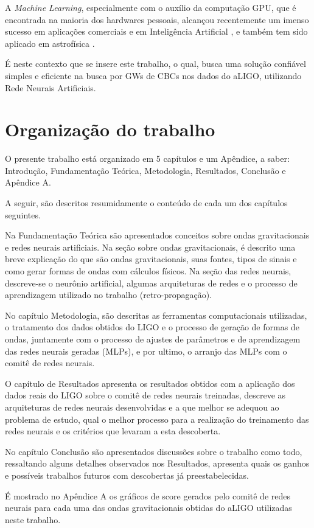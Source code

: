 A \textit{Machine Learning}, especialmente com o auxílio da computação GPU, que é encontrada na maioria dos hardwares pessoais, alcançou recentemente um imenso sucesso em aplicações comerciais e em Inteligência Artificial \cite{esteva2017dermatologist, moravvcik2017deepstack, van2016wavenet, 10.1007/978-3-319-44188-7_16}, e também tem sido aplicado em astrofísica \cite{shen2017denoising,PhysRevLett.120.141103,krastev2019real,gebhard2019convolutional,mukund2017transient,kim2015application,george2018deep,george2017glitch, george2017deepA}.

É neste contexto que se insere este trabalho, o qual, busca uma solução confiável simples e eficiente na busca por GWs de CBCs nos dados do aLIGO, utilizando Rede Neurais Artificiais.

\section{Organização do trabalho}
\label{sec:organizacao-do-trabalho}

O presente trabalho está organizado em 5 capítulos e um Apêndice, a saber: Introdução, Fundamentação Teórica, Metodologia, Resultados, Conclusão e Apêndice A. 

A seguir, são descritos resumidamente o conteúdo de cada um dos capítulos seguintes.

Na Fundamentação Teórica são apresentados conceitos sobre ondas gravitacionais e redes neurais artificiais. Na seção sobre ondas gravitacionais, é descrito uma breve explicação do que são ondas gravitacionais, suas fontes, tipos de sinais e como gerar formas de ondas com cálculos físicos. Na seção das redes neurais, descreve-se o neurônio artificial, algumas arquiteturas de redes e o processo de aprendizagem utilizado no trabalho (retro-propagação). 

No capítulo Metodologia, são descritas as ferramentas computacionais utilizadas, o tratamento dos dados obtidos do LIGO e o processo de geração de formas de ondas, juntamente com o processo de ajustes de parâmetros e de aprendizagem das redes neurais geradas (MLPs), e por ultimo, o arranjo das MLPs com o comitê de redes neurais.

O capítulo de Resultados apresenta os resultados obtidos com a aplicação dos dados reais do LIGO sobre o comitê de redes neurais treinadas, descreve as arquiteturas de redes neurais desenvolvidas e a que melhor se adequou ao problema de estudo, qual o melhor processo para a realização do treinamento das redes neurais e os critérios que levaram a esta descoberta.

No capítulo Conclusão são apresentados discussões sobre o trabalho como todo, ressaltando alguns detalhes observados nos Resultados, apresenta quais os ganhos e possíveis trabalhos futuros com descobertas já preestabelecidas.

É mostrado no Apêndice A os gráficos de score gerados pelo comitê de redes neurais para cada uma das ondas gravitacionais obtidas do aLIGO utilizadas neste trabalho.
